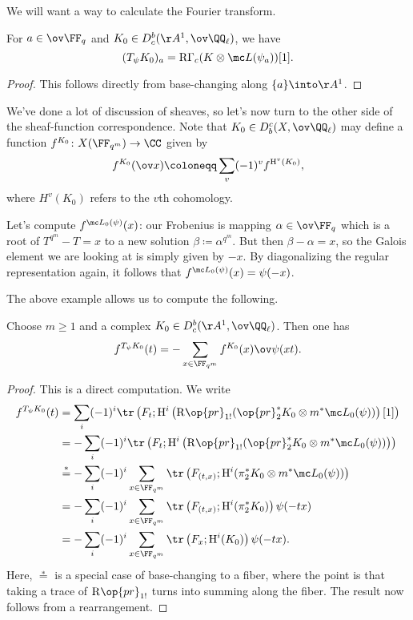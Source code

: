 \documentclass[../notes.tex]{subfiles}
\begin{document}
We will want a way to calculate the Fourier transform.
\begin{theorem}
	For $a\in\ov\FF_q$ and $K_0\in D^b_c(\AA^1,\ov\QQ_\ell)$, we have
	\[(T_\psi K_0)_a=\mathrm R\Gamma_c(K\otimes\mc L(\psi_a))[1].\]
\end{theorem}
\begin{proof}
	This follows directly from base-changing along $\{a\}\into\AA^1$.
\end{proof}
We've done a lot of discussion of sheaves, so let's now turn to the other side of the sheaf-function correspondence. Note that $K_0\in D_b^c(X,\ov\QQ_\ell)$ may define a function $f^{K_0}\colon X(\FF_{q^m})\to\CC$ given by
\[f^{K_0}(\ov x)\coloneqq\sum_{v}(-1)^vf^{\mathrm H^v(K_0)},\]
where $H^v(K_0)$ refers to the $v$th cohomology.
\begin{example}
	Let's compute $f^{\mc L_0(\psi)}(x)$: our Frobenius is mapping $\alpha\in\ov\FF_q$ which is a root of $T^{q^m}-T=x$ to a new solution $\beta\coloneqq\alpha^{q^m}$. But then $\beta-\alpha=x$, so the Galois element we are looking at is simply given by $-x$. By diagonalizing the regular representation again, it follows that $f^{\mc L_0(\psi)}(x)=\psi(-x)$.
\end{example}
The above example allows us to compute the following.
\begin{lemma} \label{lem:trace-fourier-sheaf}
	Choose $m\ge1$ and a complex $K_0\in D^b_c(\AA^1,\ov\QQ_\ell)$. Then one has
	\[f^{T_\psi K_0}(t)=-\sum_{x\in\FF_{q^m}}f^{K_0}(x)\ov\psi(xt).\]
\end{lemma}
\begin{proof}
	This is a direct computation. We write
	\begin{align*}
		f^{T_\psi K_0}(t) &= \sum_i(-1)^i\tr\left(F_t;\mathrm H^i\left(\mathrm R\op{pr}_{1!}(\op{pr}_2^*K_0\otimes m^*\mc L_0(\psi))\right)[1]\right) \\
		&= -\sum_i(-1)^i\tr\left(F_t;\mathrm H^i\left(\mathrm R\op{pr}_{1!}(\op{pr}_2^*K_0\otimes m^*\mc L_0(\psi))\right)\right) \\
		&\stackrel*= -\sum_i(-1)^i\sum_{x\in\FF_{q^m}}\tr\left(F_{(t,x)};\mathrm H^i(\pi_2^*K_0\otimes m^*\mc L_0(\psi))\right) \\
		&= -\sum_i(-1)^i\sum_{x\in\FF_{q^m}}\tr\left(F_{(t,x)};\mathrm H^i(\pi_2^*K_0)\right)\psi(-tx) \\
		&= -\sum_i(-1)^i\sum_{x\in\FF_{q^m}}\tr\left(F_{x};\mathrm H^i(K_0)\right)\psi(-tx).
	\end{align*}
	Here, $\stackrel*=$ is a special case of base-changing to a fiber, where the point is that taking a trace of $\mathrm R\op{pr}_{1!}$ turns into summing along the fiber. The result now follows from a rearrangement.
\end{proof}
\end{document}

